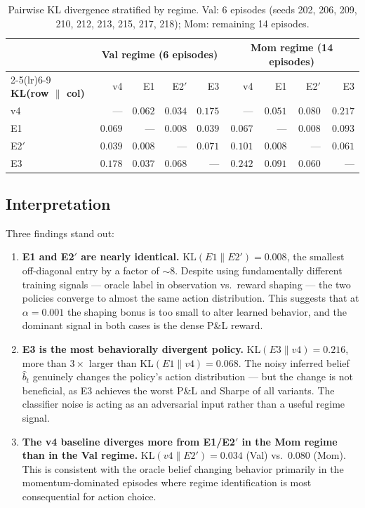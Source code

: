 \documentclass[11pt]{article}
\begin{document}
\begin{table}[H]
\centering
\begin{tabular}{lrrrr|rrrr}
\toprule
& \multicolumn{4}{c|}{\textbf{Val regime} (6 episodes)}
& \multicolumn{4}{c}{\textbf{Mom regime} (14 episodes)} \\
\cmidrule(lr){2-5}\cmidrule(lr){6-9}
\textbf{KL(row $\|$ col)} & v4 & E1 & E2$'$ & E3
                           & v4 & E1 & E2$'$ & E3 \\
\midrule
v4    & --- & $0.062$ & $0.034$ & $0.175$ & --- & $0.051$ & $0.080$ & $0.217$ \\
E1    & $0.069$ & --- & $0.008$ & $0.039$ & $0.067$ & --- & $0.008$ & $0.093$ \\
E2$'$ & $0.039$ & $0.008$ & --- & $0.071$ & $0.101$ & $0.008$ & --- & $0.061$ \\
E3    & $0.178$ & $0.037$ & $0.068$ & --- & $0.242$ & $0.091$ & $0.060$ & --- \\
\bottomrule
\end{tabular}
\caption{Pairwise KL divergence stratified by regime.
         Val: 6 episodes (seeds 202, 206, 209, 210, 212, 213, 215, 217, 218);
         Mom: remaining 14 episodes.}
\label{tab:kl_regime}
\end{table}

\subsection{Interpretation}

Three findings stand out:

\begin{enumerate}
  \item \textbf{E1 and E2$'$ are nearly identical.}
        KL$(E1 \| E2') = 0.008$, the smallest off-diagonal entry by a
        factor of $\sim 8$.
        Despite using fundamentally different training signals --- oracle
        label in observation vs.\ reward shaping --- the two policies
        converge to almost the same action distribution.
        This suggests that at $\alpha=0.001$ the shaping bonus is too
        small to alter learned behavior, and the dominant signal in both
        cases is the dense P\&L reward.

  \item \textbf{E3 is the most behaviorally divergent policy.}
        KL$(E3 \| v4) = 0.216$, more than $3\times$ larger than
        KL$(E1 \| v4) = 0.068$.
        The noisy inferred belief $\hat{b}_t$ genuinely changes the
        policy's action distribution --- but the change is not beneficial,
        as E3 achieves the worst P\&L and Sharpe of all variants.
        The classifier noise is acting as an adversarial input rather than
        a useful regime signal.

  \item \textbf{The v4 baseline diverges more from E1/E2$'$ in the Mom
        regime than in the Val regime.}
        KL$(v4 \| E2') = 0.034$ (Val) vs.\ $0.080$ (Mom).
        This is consistent with the oracle belief changing behavior
        primarily in the momentum-dominated episodes where regime
        identification is most consequential for action choice.
\end{enumerate}
\end{document}
